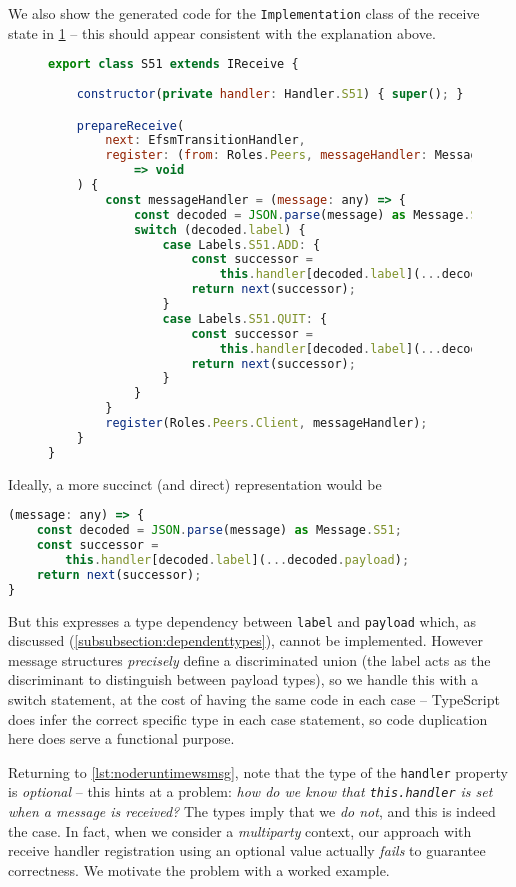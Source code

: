 We also show the generated code for the \texttt{Implementation}
class of the receive state in \cref{lst:nodereceive}
-- this should appear consistent
with the explanation above.

\begin{figure}[!h]
\begin{lstlisting}[language=javascript,tabsize=2]
export class S51 extends IReceive {
	
	constructor(private handler: Handler.S51) { super(); }

	prepareReceive(
		next: EfsmTransitionHandler,
		register: (from: Roles.Peers, messageHandler: MessageHandler)
			=> void
	) {
		const messageHandler = (message: any) => {
			const decoded = JSON.parse(message) as Message.S51;
			switch (decoded.label) {
				case Labels.S51.ADD: {
					const successor = 
						this.handler[decoded.label](...decoded.payload);
					return next(successor);
				}
				case Labels.S51.QUIT: {
					const successor = 
						this.handler[decoded.label](...decoded.payload);
					return next(successor);	
				}
			}            
		}
		register(Roles.Peers.Client, messageHandler);
	}
}
\end{lstlisting}
\label{lst:nodereceive}
\end{figure}

Ideally, a more succinct (and direct) representation would be
\begin{lstlisting}[language=javascript]
(message: any) => {
	const decoded = JSON.parse(message) as Message.S51;
	const successor = 
		this.handler[decoded.label](...decoded.payload);
	return next(successor);
}
\end{lstlisting}

But this expresses a type dependency between \texttt{label}
and \texttt{payload} which, as discussed 
(\cref{subsubsection:dependenttypes}), cannot be implemented.
However message structures \textit{precisely} 
define a discriminated union 
(the label acts as the discriminant 
to distinguish between payload types),
so we handle this with a switch statement,
at the cost of having the same code in each case --
TypeScript does infer the correct specific type in each case statement,
so code duplication here does serve a functional purpose.

Returning to \cref{lst:noderuntimewsmsg},
note that the type of the \texttt{handler} property is \textit{optional}
-- this hints at a problem: 
\textit{how do we know that \texttt{this.handler} is set when
a message is received?} The types imply that we \textit{do not},
and this is indeed the case.
In fact, when we consider a \textit{multiparty} context,
our approach with receive handler registration 
using an optional value actually \textit{fails} to guarantee correctness.
We motivate the problem with a worked
example.

